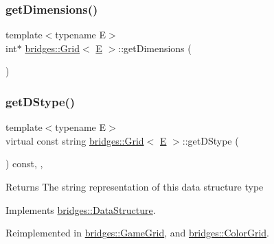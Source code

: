 \subsubsection{\texorpdfstring{getDimensions()}{getDimensions()}}
{\footnotesize\ttfamily template$<$typename E$>$ \\
int$\ast$ \mbox{\hyperlink{classbridges_1_1_grid}{bridges\+::\+Grid}}$<$ \mbox{\hyperlink{namespacebridges_acfb0a4f7877d8f63de3e6862004c50eda3a3ea00cfc35332cedf6e5e9a32e94da}{E}} $>$\+::get\+Dimensions (\begin{DoxyParamCaption}{ }\end{DoxyParamCaption})\hspace{0.3cm}{\ttfamily [inline]}}

\mbox{\label{classbridges_1_1_grid_ab701d081de4f7ffafb15966758dd5446}} 
\subsubsection{\texorpdfstring{getDStype()}{getDStype()}}
{\footnotesize\ttfamily template$<$typename E$>$ \\
virtual const string \mbox{\hyperlink{classbridges_1_1_grid}{bridges\+::\+Grid}}$<$ \mbox{\hyperlink{namespacebridges_acfb0a4f7877d8f63de3e6862004c50eda3a3ea00cfc35332cedf6e5e9a32e94da}{E}} $>$\+::get\+D\+Stype (\begin{DoxyParamCaption}{ }\end{DoxyParamCaption}) const\hspace{0.3cm}{\ttfamily [inline]}, {\ttfamily [override]}, {\ttfamily [virtual]}}

\begin{DoxyReturn}{Returns}
The string representation of this data structure type 
\end{DoxyReturn}


Implements \mbox{\hyperlink{classbridges_1_1_data_structure_a957a63b106e340bc753620c650632bdc}{bridges\+::\+Data\+Structure}}.



Reimplemented in \mbox{\hyperlink{classbridges_1_1_game_grid_a668f4f82739798f808a9f0b582d49dac}{bridges\+::\+Game\+Grid}}, and \mbox{\hyperlink{classbridges_1_1_color_grid_a6bb93994dade8e79a197459532dad153}{bridges\+::\+Color\+Grid}}.

\mbox{\label{classbridges_1_1_grid_ad5b960f574d1f5bddfffbfd8ce2d870b}} 
